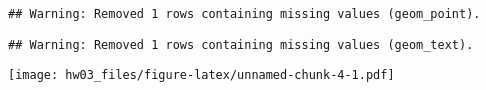 \documentclass[]{article}
\newenvironment{Shaded}{\begin{snugshade}}{\end{snugshade}}
\newcommand{\DataTypeTok}[1]{\textcolor[rgb]{0.13,0.29,0.53}{#1}}
\newcommand{\DecValTok}[1]{\textcolor[rgb]{0.00,0.00,0.81}{#1}}
\newcommand{\KeywordTok}[1]{\textcolor[rgb]{0.13,0.29,0.53}{\textbf{#1}}}
\newcommand{\NormalTok}[1]{#1}
\newcommand{\OperatorTok}[1]{\textcolor[rgb]{0.81,0.36,0.00}{\textbf{#1}}}
\newcommand{\StringTok}[1]{\textcolor[rgb]{0.31,0.60,0.02}{#1}}
\begin{document}
\begin{Shaded}
\end{Shaded}

\begin{verbatim}
## Warning: Removed 1 rows containing missing values (geom_point).
\end{verbatim}

\begin{verbatim}
## Warning: Removed 1 rows containing missing values (geom_text).
\end{verbatim}

\texttt{[image: hw03\_files/figure-latex/unnamed-chunk-4-1.pdf]}
\end{document}
